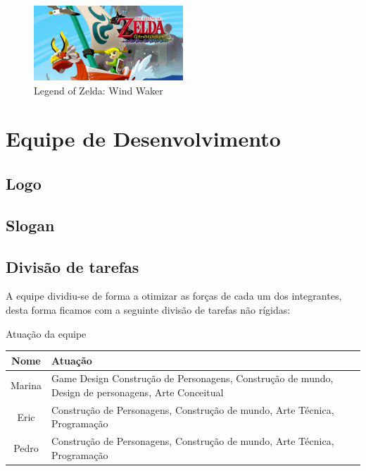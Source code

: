 \begin{figure}[!htb] \caption{\label{fig_moss}Legend of Zelda: Wind Waker} \begin{center}
\includegraphics[width=0.5\textwidth]{imagens/windwaker.jpeg} \end{center}
 \end{figure}

\section{Equipe de Desenvolvimento}

\subsection{Logo}

\subsection{Slogan}

\subsection{Divisão de tarefas}

A equipe dividiu-se de forma a
otimizar as forças de cada um dos integrantes, desta forma ficamos com a
seguinte divisão de tarefas não rígidas:

\begin{quadro}[htb] \caption{\label{quadro_atuacao}Atuação da equipe}
    \begin{tabularx}{\textwidth}{|c|X|} \hline \textbf{Nome} &
        \textbf{Atuação}\\ \hline Marina & Game Design Construção de
        Personagens, Construção de mundo, Design de personagens, Arte Conceitual
        \\ \hline Eric   & Construção de Personagens, Construção de mundo, Arte
        Técnica, Programação                                        \\ \hline
        Pedro  & Construção de Personagens, Construção de mundo, Arte Técnica,
        Programação \\ \hline \end{tabularx} 
\end{quadro}
